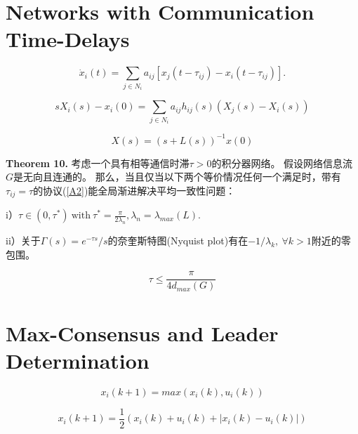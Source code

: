 \documentclass{article}
\begin{document}
\section{Networks with Communication Time-Delays}

\begin{equation}
    \dot{x}_i(t) = \sum_{j\in N_i} a_{ij} [x_j(t-\tau_{ij}) - x_i(t-\tau_{ij})].
    \tag{37}
    \label{37}
\end{equation}

\begin{equation}
    sX_i(s) - x_i(0) = \sum_{j\in N_i} a_{ij} h_{ij}(s) (X_j(s) - X_i(s))
    \tag{38}
    \label{38}
\end{equation}

\begin{equation}
    X(s) = (s+L(s))^{-1}x(0)
    \tag{39}
    \label{39}
\end{equation}

\noindent \textbf{Theorem 10.} 考虑一个具有相等通信时滞$\tau > 0$的积分器网络。
假设网络信息流$G$是无向且连通的。
那么，当且仅当以下两个等价情况任何一个满足时，带有$\tau_{ij} = \tau$的协议(\ref{A2})能全局渐进解决平均一致性问题：

i）$\tau \in (0, \tau^*)\ \text{with}\ \tau^*=\frac{\pi}{2\lambda_n}, \lambda_n=\lambda_{max}(L)$.

ii）关于$\Gamma(s) = e^{-\tau s}/s$的奈奎斯特图(Nyquist plot)有在$-1/\lambda_k,\ \forall k > 1$附近的零包围。

\begin{equation}
    \tau \le \frac{\pi}{4d_{max}(G)}
    \tag{40}
    \label{40}
\end{equation}

\section{Max-Consensus and Leader Determination}

\begin{equation}
    \tag{41}
    \label{41}
    x_i(k+1)=max(x_i(k),u_i(k))
\end{equation}

\begin{equation}
    \tag{42}
    \label{42}
    x_i(k+1) = \frac{1}{2}(x_i(k)+u_i(k)+|x_i(k)-u_i(k)|)
\end{equation}
\end{document}
